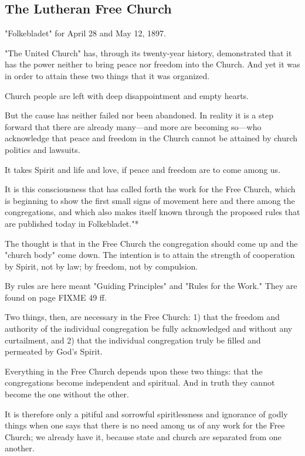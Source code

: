 
\subsection{The Lutheran Free Church}

"Folkebladet" for April 28 and May 12, 1897.

"The United Church" has, through its twenty-year history, demonstrated that it has the power neither to bring peace nor freedom into the Church. And yet it was in order to attain these two things that it was organized.

Church people are left with deep disappointment and empty hearts.

But the cause has neither failed nor been abandoned. In reality it is a step forward that there are already many---and more are becoming so---who acknowledge that peace and freedom in the Church cannot be attained by church politics and lawsuits.

It takes Spirit and life and love, if peace and freedom are to come among us.

It is this consciousness that has called forth the work for the Free Church, which is beginning to show the first small signs of movement here and there among the congregations, and which also makes itself known through the proposed rules that are published today in Folkebladet."*

The thought is that in the Free Church the congregation should come up and the "church body" come down. The intention is to attain the strength of cooperation by Spirit, not by law; by freedom, not by compulsion.

By rules are here meant "Guiding Principles" and "Rules for the Work." They are found on page {FIXME 49 ff}.

Two things, then, are necessary in the Free Church: 1) that the freedom and authority of the individual congregation be fully acknowledged and without any curtailment, and 2) that the individual congregation truly be filled and permeated by God’s Spirit.

Everything in the Free Church depends upon these two things: that the congregations become independent and spiritual. And in truth they cannot become the one without the other.

It is therefore only a pitiful and sorrowful spiritlessness and ignorance of godly things when one says that there is no need among us of any work for the Free Church; we already have it, because state and church are separated from one another.

